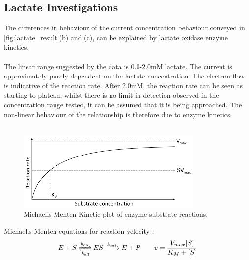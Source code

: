 \subsection{Lactate Investigations}
The differences in behaviour of the current concentration behaviour conveyed in \autoref{fig:lactate_result}(b) and (c), can be explained by lactate oxidase enzyme kinetics.\\\\
The linear range suggested by the data is 0.0-2.0mM lactate. The current is approximately purely dependent on the lactate concentration. The electron flow is indicative of the reaction rate. 
After 2.0mM, the reaction rate can be seen as starting to plateau, whilst there is no limit in detection observed in the concentration range tested, it can be assumed that it is being approached. The non-linear behaviour of the relationship is therefore due to enzyme kinetics.\\\\
\begin{figure}[H]
    \centering
    \includegraphics{img/lactate_discussion_1.png}
    \caption{Michaelis-Menten Kinetic plot of enzyme substrate reactions. }
    \label{fig:lactate_discussion}
\end{figure}
Michaelis Menten equations for reaction velocity \cite{johnson2011original}:
\begin{equation}
    E + S \xrightleftharpoons[k_{\text{off}}]{k_{\text{on}}} ES \xrightarrow{k_{cat}} E+P \quad \quad v = \frac{V_{max}[S]}{K_{M}+[S]}
\end{equation}
